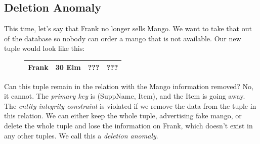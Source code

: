 \documentclass{report}
\begin{document}
    \subsection*{Deletion Anomaly}
This time, let's say that Frank no longer sells Mango. We want to take that out of the database so nobody can order a mango that is not available. Our new tuple would look like this:
\begin{figure}[ht]
\centering
\setlength{\tabcolsep}{39}
\begin{tabular}{c c c c}
\hline
Frank & 30 Elm & ???  & ??? \\
          \hline
          \end{tabular}
          \end{figure}
\bigbreak \noindent
Can this tuple remain in the relation with the Mango information removed?
\bigbreak \noindent
No, it cannot. The \textit{primary key} is (SuppName, Item), and the Item is going away. The \textit{entity integrity constraint} is violated if we remove the data from the tuple in this relation. We can either keep the whole tuple, advertising fake mango, or delete the whole tuple and lose the information on Frank, which doesn't exist in any other tuples. We call this a \textit{deletion anomaly}.
\end{document}
